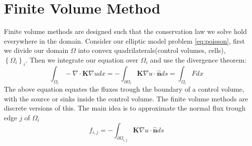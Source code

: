 \documentclass[../Main/main.tex]{subfiles}
\begin{document}
	\section*{Finite Volume Method}

		Finite volume methods are designed such that the conservation law we solve hold everywhere in the domain. Consider our elliptic model problem \eqref{eq:poisson}, first we divide our domain $\Omega$ into convex quadrilaterals(control volumes, cells), $\left \{ \Omega_i \right \}_i$. Then we integrate our equation over $\Omega_i$ and use the divergence theorem:
	\begin{equation}\label{eq:fvm1}
		\int_{\Omega_i} -\nabla \cdot \bm{K} \nabla u dx = -\int_{\partial \Omega_i} \bm{K}\nabla u \cdot \bm{\hat{n}} ds = \int_{\Omega_i} F dx
	\end{equation}
	The above equation equates the fluxes trough the boundary of a control volume, with the source or sinks inside the control volume. The finite volume methods are discrete versions of this. The main idea is to approximate the normal flux trough edge $j$ of $\Omega_i$
	\begin{equation}
		f_{i,j} =-\int_{\partial \Omega_{i,j}} \bm{K}\nabla u \cdot \bm{\hat{n}} ds
	\end{equation}
	
\end{document}
